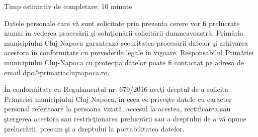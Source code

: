 \documentclass[10pt,a4paper,landscape]{article}
\begin{document}
\vspace{0.3cm}

Timp estimativ de completare: 10 minute

Datele personale care vă sunt solicitate prin prezenta cerere vor fi prelucrate numai în vederea procesării şi soluţionării solicitării dumneavoastră. Primăria municipiului Cluj-Napoca garantează securitatea procesării datelor şi arhivarea acestora în conformitate cu prevederile legale în vigoare. Responsabilul Primăriei municipiului Cluj-Napoca cu protecţia datelor poate fi contactat pe adresa de email dpo@primariaclujnapoca.ro.

În conformitate cu Regulamentul nr. 679/2016 aveţi dreptul de a solicita Primăriei municipiului Cluj-Napoca, în ceea ce priveşte datele cu caracter personal referitoare la persoana vizată, accesul la acestea, rectificarea sau ştergerea acestora sau restricţionarea prelucrării sau a dreptului de a vă opune prelucrării, precum şi a dreptului la portabilitatea datelor.
\end{document}
